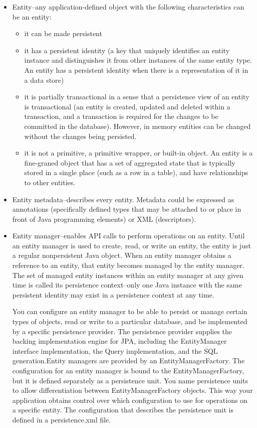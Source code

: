 \begin{itemize}
\item Entity–any application-defined object with the following characteristics can be an entity:

\begin{itemize}
\item it can be made persistent

\item it has a persistent identity (a key that uniquely identifies an entity instance and distinguishes it from other instances of the same entity type. An entity has a persistent identity when there is a representation of it in a data store)

\item it is partially transactional in a sense that a persistence view of an entity is transactional (an entity is created, updated and deleted within a transaction, and a transaction is required for the changes to be committed in the database). However, in memory entities can be changed without the changes being persisted.
\item it is not a primitive, a primitive wrapper, or built-in object. An entity is a fine-graned object that has a set of aggregated state that is typically stored in a single place (such as a row in a table), and have relationships to other entities.
\end{itemize}

\item Entity metadata–describes every entity. Metadata could be expressed as annotations (specifically defined types that may be attached to or place in front of Java programming elements) or XML (descriptors).
\item Entity manager–enables API calls to perform operations on an entity. Until an entity manager is used to create, read, or write an entity, the entity is just a regular nonpersistent Java object. When an entity manager obtains a reference to an entity, that entity becomes managed by the entity manager. The set of managed entity instances within an entity manager at any given time is called its persistence context–only one Java instance with the same persistent identity may exist in a persistence context at any time.

You can configure an entity manager to be able to persist or manage certain types of objects, read or write to a particular database, and be implemented by a specific persistence provider. The persistence provider supplies the backing implementation engine for JPA, including the EntityManager interface implementation, the Query implementation, and the SQL generation.Entity managers are provided by an EntityManagerFactory. The configuration for an entity manager is bound to the EntityManagerFactory, but it is defined separately as a persistence unit. You name persistence units to allow differentiation between EntityManagerFactory objects. This way your application obtains control over which configuration to use for operations on a specific entity. The configuration that describes the persistence unit is defined in a persistence.xml file.


\end{itemize}
